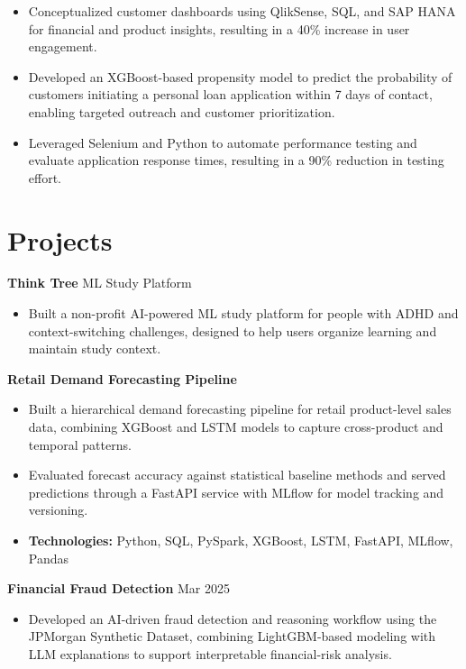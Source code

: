 \documentclass[10pt,a4paper]{article}
\begin{document}
\begin{itemize}
  \item Conceptualized customer dashboards using QlikSense, SQL, and SAP HANA for financial and product insights, resulting in a 40\% increase in user engagement.
  \item Developed an XGBoost-based propensity model to predict the probability of customers initiating a personal loan application within 7 days of contact, enabling targeted outreach and customer prioritization.
  \item Leveraged Selenium and Python to automate performance testing and evaluate application response times, resulting in a 90\% reduction in testing effort.
\end{itemize}


\section{Projects}
\textbf{Think Tree} \textbar{} ML Study Platform\par
\begin{itemize}
  \item Built a non-profit AI-powered ML study platform for people with ADHD and context-switching challenges, designed to help users organize learning and maintain study context.
\end{itemize}
\textbf{Retail Demand Forecasting Pipeline}\par
\begin{itemize}
  \item Built a hierarchical demand forecasting pipeline for retail product-level sales data, combining XGBoost and LSTM models to capture cross-product and temporal patterns.
  \item Evaluated forecast accuracy against statistical baseline methods and served predictions through a FastAPI service with MLflow for model tracking and versioning.
  \item \textbf{Technologies:} Python, SQL, PySpark, XGBoost, LSTM, FastAPI, MLflow, Pandas
\end{itemize}
\textbf{Financial Fraud Detection} \textbar{} Mar 2025\par
\begin{itemize}
  \item Developed an AI-driven fraud detection and reasoning workflow using the JPMorgan Synthetic Dataset, combining LightGBM-based modeling with LLM explanations to support interpretable financial-risk analysis.
\end{itemize}
\end{document}
